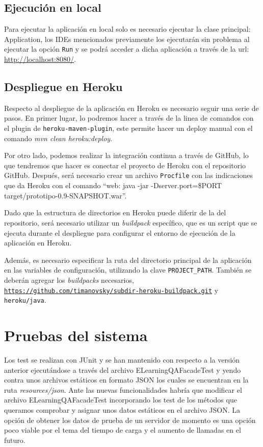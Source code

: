 \subsection{Ejecución en local}
Para ejecutar la aplicación en local solo es necesario ejecutar la clase principal: Application, los IDEs mencionados previamente los ejecutarán sin problema al ejecutar la opción \texttt{Run} y se podrá acceder a dicha aplicación a través de la url: \url{http://localhost:8080/}.

\subsection{Despliegue en Heroku}
Respecto al despliegue de la aplicación en Heroku es necesario seguir una serie de pasos. En primer lugar, lo podremos hacer a través de la linea de comandos con el plugin de \texttt{heroku-maven-plugin}, este permite hacer un deploy manual con el comando \textit{mvn clean heroku:deploy}.

Por otro lado, podemos realizar la integración continua a través de GitHub, lo que tendremos que hacer es conectar el proyecto de Heroku con el repositorio GitHub. Después, será necesario crear un archivo \texttt{Procfile} con las indicaciones que da Heroku con el comando ``web: java -jar -Dserver.port=\$PORT target/prototipo-0.9-SNAPSHOT.war''. 

Dado que la estructura de directorios en Heroku puede diferir de la del repositorio, será necesario utilizar un \textit{buildpack} específico, que es un script que se ejecuta durante el despliegue para configurar el entorno de ejecución de la aplicación en Heroku.

Además, es necesario especificar la ruta del directorio principal de la aplicación en las variables de configuración, utilizando la clave \texttt{PROJECT\_PATH}. También se deberán agregar los \textit{buildpacks} necesarios, \texttt{\url{https://github.com/timanovsky/subdir-heroku-buildpack.git}} y \texttt{heroku/java}.

\section{Pruebas del sistema}
Los test se realizan con JUnit y se han mantenido con respecto a la versión anterior ejecutándose a través del archivo ELearningQAFacadeTest y yendo contra unos archivos estáticos en formato JSON los cuales se encuentran en la ruta \textit{resources/json}. Ante las nuevas funcionalidades habría que modificar el archivo ELearningQAFacadeTest incorporando los test de los métodos que queramos comprobar y asignar unos datos estáticos en el archivo JSON. La opción de obtener los datos de prueba de un servidor de momento es una opción poco viable por el tema del tiempo de carga y el aumento de llamadas en el futuro.